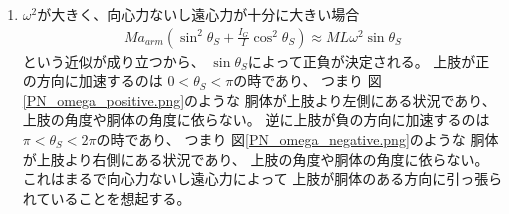 \documentclass[a4paper,11pt]{jsarticle}
\begin{document}
\begin{enumerate}
  \item $\omega^2$が大きく、向心力ないし遠心力が十分に大きい場合
  \begin{align}
    Ma_{arm}\left( \sin^2\theta_S + \frac{I_G}{I}\cos^2\theta_S \right)
    \approx ML\omega^2 \sin\theta_S
    \label{eq:PB:a_arm_MLw2}
  \end{align}
  という近似が成り立つから、
  $\sin\theta_S$によって正負が決定される。
  上肢が正の方向に加速するのは
  $0<\theta_S<\pi$の時であり、
  つまり
  図\ref{PN_omega_positive.png}のような
  胴体が上肢より左側にある状況であり、
  上肢の角度や胴体の角度に依らない。
  逆に上肢が負の方向に加速するのは
  $\pi<\theta_S<2\pi$の時であり、
  つまり
  図\ref{PN_omega_negative.png}のような
  胴体が上肢より右側にある状況であり、
  上肢の角度や胴体の角度に依らない。
  これはまるで向心力ないし遠心力によって
  上肢が胴体のある方向に引っ張られていることを想起する。


\end{enumerate}
\end{document}
